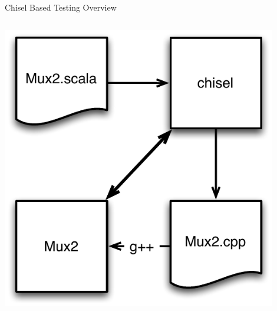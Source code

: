 \documentclass[xcolor=pdflatex,dvipsnames,table]{beamer}
\begin{document}
\begin{frame}{Chisel Based Testing Overview}
\begin{columns}
\begin{center}
\includegraphics[width=0.9\textwidth]{figs/chisel-testing.pdf}
\end{center}
\end{columns}
\end{frame}
\end{document}

